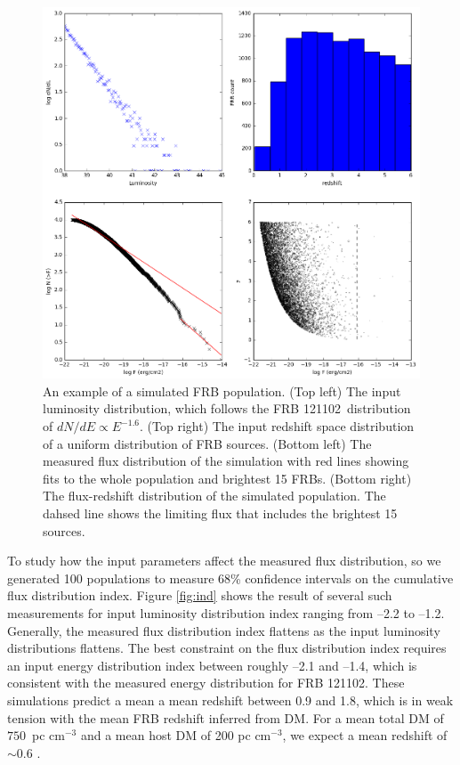 \documentclass[twocolumn]{aastex61}
\newcommand{\frb}{FRB 121102}
\begin{document}
\begin{figure}[htb]
\begin{center}
\includegraphics[width=1.8\columnwidth]{sim_L1.6}
\caption{An example of a simulated FRB population. (Top left) The input luminosity distribution, which follows the \frb\ distribution of $dN/dE\propto E^{-1.6}$. (Top right) The input redshift space distribution of a uniform distribution of FRB sources. (Bottom left) The measured flux distribution of the simulation with red lines showing fits to the whole population and brightest 15 FRBs. (Bottom right) The flux-redshift distribution of the simulated population. The dahsed line shows the limiting flux that includes the brightest 15 sources.
\label{fig:sim}}
\end{center}
\end{figure}

To study how the input parameters affect the measured flux distribution, so we generated 100 populations to measure 68\% confidence intervals on the cumulative flux distribution index. Figure \ref{fig:ind} shows the result of several such measurements for input luminosity distribution index ranging from --2.2 to --1.2. Generally, the measured flux distribution index flattens as the input luminosity distributions flattens. The best constraint on the flux distribution index \citep{2016ApJ...830...75V} requires an input energy distribution index between roughly --2.1 and --1.4, which is consistent with the measured energy distribution for \frb. These simulations predict a mean a mean redshift between 0.9 and 1.8, which is in weak tension with the mean FRB redshift inferred from DM. For a mean total DM of $750$\ pc cm$^{-3}$ and a mean host DM of 200 pc cm$^{-3}$, we expect a mean redshift of $\sim0.6$ \citep[$z=DM/900$\ pc cm$^{-3}$;][]{2004MNRAS.348..999I}. 
\end{document}

